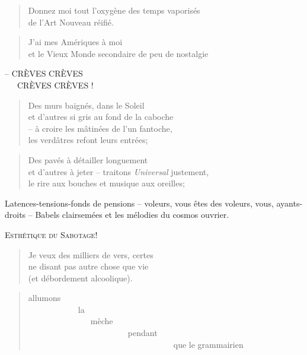  \begin{verse}
    Donnez moi tout l’oxygène des temps vaporisés\\
    de l’Art Nouveau réifié.
  \end{verse}
  \begin{verse}
    J’ai mes Amériques à moi\\
    et le Vieux Monde secondaire de peu de nostalgie
  \end{verse}
  \begin{center}
    -- CRÈVES CRÈVES\\
    ~~~CRÈVES CRÈVES !
  \end{center}
  \begin{verse}
    Des murs baignés, dans le Soleil\\
    et d’autres si gris au fond de la caboche\\
    -- à croire les mâtinées de l’un fantoche,\\
    les verdâtres refont leurs entrées;
  \end{verse}
  \begin{verse}
    Des pavés à détailler longuement\\
    et d’autres à jeter -- traitons \textit{Universal} justement,\\
    le rire aux bouches et musique aux oreilles;
  \end{verse}
  \begin{flushright}
    Latences-tensions-fonds de pensions -- voleurs, vous êtes des voleurs,
    vous, ayants-droits -- Babels clairsemées et les mélodies du cosmos
    ouvrier.
  \end{flushright}
  \begin{center}
     \textsc{Esthétique du Sabotage!}
  \end{center}
  \begin{verse}
    Je veux des milliers de vers, certes\\
    ne disant pas autre chose que vie\\
    (et débordement alcoolique).
  \end{verse}
  \begin{verse}
    allumons\\
    ~~~~~~~~~~~~la\\
    ~~~~~~~~~~~~~~~mèche\\
    ~~~~~~~~~~~~~~~~~~~~~~~~pendant\\
    ~~~~~~~~~~~~~~~~~~~~~~~~~~~~~~~~~~~que le grammairien
  \end{verse}
